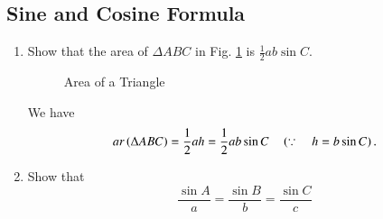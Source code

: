\subsection{Sine and Cosine Formula}
\begin{enumerate}[label=\thesubsection.\arabic*.,ref=\thesubsection.\theenumi]
\item
\label{prob:tri_area_sin}
	Show that the area of $\Delta ABC$ in Fig. 	\ref{fig:tri_sss}	is $\frac{1}{2}ab \sin C$.
\begin{figure}[!ht]
	\begin{center}
			\resizebox{0.6\columnwidth}{!}{}
	\end{center}
	\caption{Area of a Triangle}
	\label{fig:tri_sss}	
\end{figure}

\solution We have
%
\begin{equation}
ar\left(\Delta ABC\right) = \frac{1}{2}ah = \frac{1}{2}ab\sin C \quad \left(\because \quad h = b \sin C\right).
\label{eq:tri_area_sin}
\end{equation}

\item
	Show that 
	\begin{equation}
	\frac{\sin A}{a} = \frac{\sin B}{b} = \frac{\sin C}{c}
	\end{equation}


\end{enumerate}
